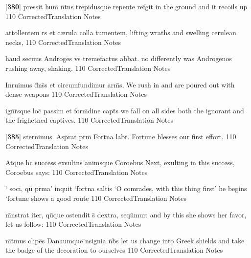 \latline
  {[\textbf{380}] pressit hum\={\macron {\i}} n\={\macron {\i}}t\={}ns trepidusque repente ref\={}git}
  { in the ground and it recoils up }
  {110}
  { CorrectedTranslation }
  { Notes }


\latline
  {attollentem \={\macron {\i}}r\={}s et c{\ae}rula colla tumentem,}
  { lifting wraths and swelling cerulean necks, }
  {110}
  { CorrectedTranslation }
  { Notes }


\latline
  {haud secuus Androge\={}s v\={\macron {\i}}s\={} tremefactus ab\={\macron {\i}}bat.}
  { no differently was Androgenos rushing away, shaking. }
  {110}
  { CorrectedTranslation }
  { Notes }


\latline
  {Inruimus d\={}ns\={\macron {\i}}s et circumfundimur arm\={\macron {\i}}s,}
  { We rush in and are poured out with dense weapons }
  {110}
  { CorrectedTranslation }
  { Notes }


\latline
  {ign\={}r\={}sque loc\={\macron {\i}} passim et form\={\macron {\i}}dine capt\={}s}
  { we fall on all sides both the ignorant and the frighetned captives. }
  {110}
  { CorrectedTranslation }
  { Notes }


\latline
  {[\textbf{385}] sternimus.  Asp\={\macron {\i}}rat pr\={\macron {\i}}m\={} Fort\={}na lab\={}r\={\macron {\i}}.}
  { Fortune blesses our first effort. }
  {110}
  { CorrectedTranslation }
  { Notes }


\latline
  {Atque h\={\macron {\i}}c success\={} exsult\={}ns anim\={\macron {\i}}sque Coroebus}
  { Next, exulting in this success, Coroebus says: }
  {110}
  { CorrectedTranslation }
  { Notes }


\latline
  {`\={} soci\={\macron {\i}}, qu\={} pr\={\macron {\i}}ma' inquit `fort\={}na sal\={}tis}
  { `O comrades, with this thing first' he begins `fortune shows a good route }
  {110}
  { CorrectedTranslation }
  { Notes }


\latline
  {m\={}nstrat iter, qu\={}que ostendit s\={} dextra, sequ\={}mur:}
  { and by this she shows her favor, let us follow: }
  {110}
  { CorrectedTranslation }
  { Notes }


\latline
  {m\={}t\={}mus clipe\={}s Danaumque \={\macron {\i}}nsignia n\={}b\={\macron {\i}}s}
  { let us change into Greek shields and take the badge of the decoration to ourselves }
  {110}
  { CorrectedTranslation }
  { Notes }


